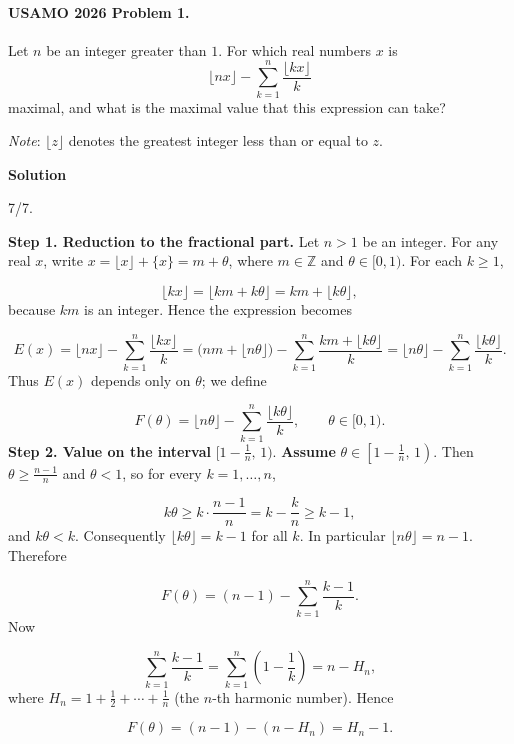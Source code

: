 \documentclass{llmxive}
\providecommand{\solutionheading}[1]{\par\smallskip\noindent\textbf{#1}\par}
\begin{document}
\paragraph{USAMO 2026 Problem 1.}
\begin{mdframed}[style=mdpurplebox,frametitle={USAMO 2026 Problem 1}]
Let $n$ be an integer greater than $1$. For which real numbers $x$ is
\[
\lfloor nx \rfloor - \sum_{k=1}^{n} \frac{\lfloor kx \rfloor}{k}
\]
maximal, and what is the maximal value that this expression can take?

\emph{Note}: $\lfloor z \rfloor$ denotes the greatest integer less than or equal to $z$.
\end{mdframed}
\solutionheading{Solution}
\begin{remark*}
  7/7.
\end{remark*}
\textbf{Step 1. Reduction to the fractional part.} Let \(n>1\) be an integer. For any real \(x\), write \(x = \lfloor x\rfloor + \{x\} = m + \theta\), where \(m\in\mathbb Z\) and \(\theta\in[0,1)\). For each \(k\ge 1\),\par
\[
\lfloor kx \rfloor = \lfloor km + k\theta \rfloor = km + \lfloor k\theta \rfloor,
\]
because \(km\) is an integer. Hence the expression becomes\par
\[
E(x) = \lfloor nx \rfloor - \sum_{k=1}^{n}\frac{\lfloor kx\rfloor}{k}
= \bigl( nm + \lfloor n\theta\rfloor \bigr) - \sum_{k=1}^{n}\frac{km + \lfloor k\theta\rfloor}{k}
= \lfloor n\theta\rfloor - \sum_{k=1}^{n}\frac{\lfloor k\theta\rfloor}{k}.
\]
Thus \(E(x)\) depends only on \(\theta\); we define\par
\[
F(\theta) = \lfloor n\theta\rfloor - \sum_{k=1}^{n}\frac{\lfloor k\theta\rfloor}{k},\qquad \theta\in[0,1).
\]
\textbf{Step 2. Value on the interval }\(\bigl[1-\frac1n,\,1\bigr)\).\textbf{ Assume }\(\theta\in\left[1-\frac1n,\,1\right)\). Then \(\theta\ge \frac{n-1}{n}\) and \(\theta<1\), so for every \(k=1,\dots,n\),\par
\[
k\theta \ge k\cdot\frac{n-1}{n}=k-\frac{k}{n}\ge k-1,
\]
and \(k\theta < k\). Consequently \(\lfloor k\theta\rfloor = k-1\) for all \(k\). In particular \(\lfloor n\theta\rfloor = n-1\). Therefore\par
\[
F(\theta) = (n-1) - \sum_{k=1}^{n}\frac{k-1}{k}.
\]
Now\par
\[
\sum_{k=1}^{n}\frac{k-1}{k} = \sum_{k=1}^{n}\left(1-\frac1k\right) = n - H_n,
\]
where \(H_n = 1 + \frac12 + \cdots + \frac1n\) (the \(n\)-th harmonic number). Hence\par
\[
F(\theta) = (n-1) - (n-H_n) = H_n - 1.
\]
\end{document}
